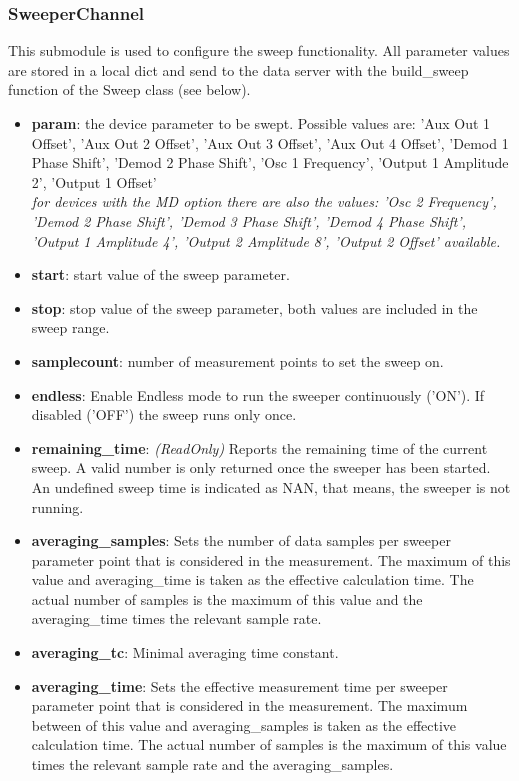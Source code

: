 \documentclass[11pt]{article} %
\begin{document}
\subsubsection{SweeperChannel}
This submodule is used to configure the sweep functionality. All parameter values are stored in a local dict and send  to the data server with the build\_sweep function of the Sweep class (see below).
\begin{itemize}
\item {\bf param}: the device parameter to be swept. Possible values are: 'Aux Out 1 Offset', 'Aux Out 2 Offset',
	'Aux Out 3 Offset', 'Aux Out 4 Offset', 'Demod 1 Phase Shift', 'Demod 2 Phase Shift', 'Osc 1 Frequency',
	'Output 1 Amplitude 2', 'Output 1 Offset' \\
	{\it for devices with the MD option there are also the values: 'Osc 2 Frequency', 'Demod 2 Phase Shift',
	'Demod 3 Phase Shift', 'Demod 4 Phase Shift', 'Output 1 Amplitude 4', 'Output 2 Amplitude 8', 'Output 2 Offset'
	available.}
\item {\bf start}: start value of the sweep parameter.
\item {\bf stop}: stop value of the sweep parameter, both values are included in the sweep range.
\item {\bf samplecount}: number of measurement points to set the sweep on.
\item {\bf endless}: Enable Endless mode to run the sweeper continuously ('ON'). If disabled ('OFF') the sweep runs only once.
\item {\bf remaining\_time}: {\it (ReadOnly)} Reports the remaining time of the current sweep. A valid number is only returned once the sweeper has been started. An undefined sweep time is indicated as NAN, that means, the sweeper is not running.
\item {\bf averaging\_samples}: Sets the number of data samples per sweeper parameter point that is considered in the measurement. The maximum of this value and averaging\_time is taken as the effective calculation time. The actual number of samples is the maximum of this value and the averaging\_time times the relevant sample rate.
\item {\bf averaging\_tc}: Minimal averaging time constant.
\item {\bf averaging\_time}: Sets the effective measurement time per sweeper parameter point that is considered in the measurement. The maximum between of this value and averaging\_samples is taken as the effective calculation time. The actual number of samples is the maximum of this value times the relevant sample rate and the averaging\_samples.

\end{itemize}
\end{document}
